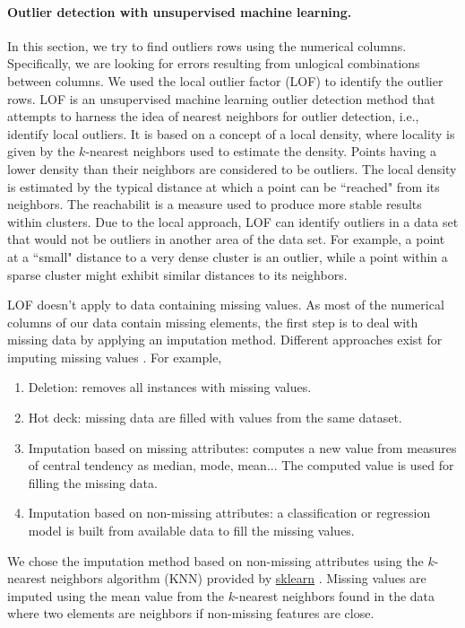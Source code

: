 \documentclass{article}
\begin{document}
\paragraph{Outlier detection with unsupervised machine learning.} %
\label{sub:Outlier detection with machine learning}
In this section, we try to find outliers rows using the numerical columns.
Specifically, we are looking for errors resulting from unlogical combinations between columns.
We used the local outlier factor (LOF) to identify the outlier rows.
LOF is an unsupervised machine learning outlier detection method that attempts to harness the idea of nearest neighbors for outlier detection, i.e., identify local outliers.
It is based on a concept of a local density, where locality is given by the $k$-nearest neighbors used to estimate the density.
Points having a lower density than their neighbors are considered to be outliers.
The local density is estimated by the typical distance at which a point can be ``reached" from its neighbors.
The reachabilit is a measure used to produce more stable results within clusters.
Due to the local approach, LOF can identify outliers in a data set that would not be outliers in another area of the data set.
For example, a point at a ``small" distance to a very dense cluster is an outlier, while a point within a sparse cluster might exhibit similar distances to its neighbors.

LOF doesn't apply to data containing missing values.
As most of the numerical columns of our data contain missing elements, the first step is to deal with missing data by applying an imputation method.
Different approaches exist for imputing missing values \cite{corr_lede}.
For example,
\begin{enumerate}
    \item Deletion: removes all instances with missing values.
    \item Hot deck: missing data are filled with values from the same dataset.
    \item Imputation based on missing attributes: computes a new value from measures of central tendency as median, mode, mean...
    The computed value is used for filling the missing data.
    \item Imputation based on non-missing attributes: a classification or regression model is built from available data to fill the missing values.
\end{enumerate}
We chose the imputation method based on non-missing attributes using the $k$-nearest neighbors algorithm (KNN) provided by \href{https://scikit-learn.org/stable/modules/generated/sklearn.impute.KNNImputer.html}{sklearn} \cite{Olga+al:2001}.
Missing values are imputed using the mean value from the $k$-nearest neighbors found in the data where two elements are neighbors if non-missing features are close.
\end{document}
